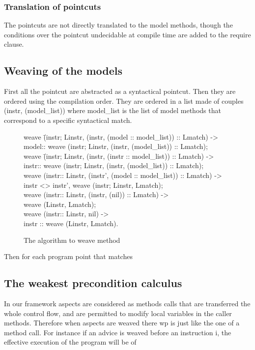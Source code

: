 \documentclass[draft]{llncs}
\begin{document}
\subsubsection{Translation of pointcuts}
The pointcuts are not directly translated to the model methods, though the conditions over the pointcut undecidable
at compile time are added to the require clause.
\subsection{Weaving of the models}
First all the pointcut are abstracted as a syntactical pointcut. Then they are ordered using the compilation
order.
They are ordered in a list made of couples (instr, (model\_list)) where model\_list is the list of model methods 
that correspond to a specific syntactical match.

%
\begin{figure}
\bcode
weave \=(instr; Linstr, (instr, (model :: model\_list)) :: Lmatch) -> \\
\>model:: weave (instr; Linstr, (instr, (model\_list)) :: Lmatch);\\
weave \=(instr; Linstr, (instr, (instr :: model\_list)) :: Lmatch) -> \\
\>instr:: weave (instr; Linstr, (instr, (model\_list)) :: Lmatch);\\
weave (instr:: Linstr, (instr', (model :: model\_list)) :: Lmatch) -> \\
\>instr <> instr',  weave (instr; Linstr, Lmatch);\\
weave (instr:: Linstr, (instr, (nil)) :: Lmatch) -> \\
\>weave (Linstr, Lmatch);\\
weave (instr:: Linstr, nil) -> \\
\>instr :: weave (Linstr, Lmatch).
\ecode
\caption{The algorithm to weave method}
\label{weaving_algo}
\end{figure}
Then for each program point that matches

\subsection{The weakest precondition calculus}

In our framework aspects are considered as methods calls that are transferred the whole
control flow, and are permitted to modify local variables in the caller methods. Therefore when aspects are weaved
there wp is just like the one of a method call.
For instance if an advice is weaved before an instruction i, the effective execution of the program
will be of
\end{document}
